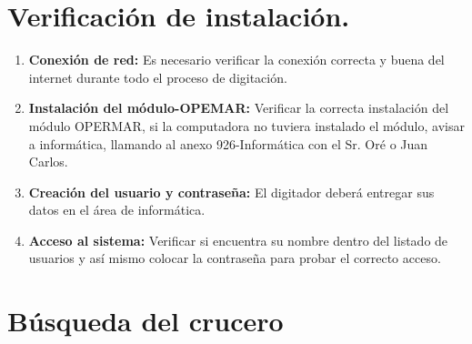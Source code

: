 \documentclass[a4paper,oneside,11pt]{book}
\begin{document}
\section {Verificación de instalación.}
\begin{enumerate}
\item\textbf{Conexión de red:} Es necesario verificar la conexión correcta y buena del internet durante todo el proceso de digitación.
\item \textbf{Instalación del módulo-OPEMAR:} Verificar la correcta instalación del módulo OPERMAR, si la computadora no tuviera instalado el módulo, avisar a informática, llamando al anexo 926-Informática con el Sr. Oré o Juan Carlos.
\item \textbf{Creación del usuario y contraseña:} El digitador deberá entregar sus datos en el área de informática.
\item\textbf{ Acceso al sistema:} Verificar si encuentra su nombre dentro del listado de usuarios y así mismo colocar la contraseña para probar el correcto acceso.
\end{enumerate}


\section{Búsqueda del crucero}
\end{document}
